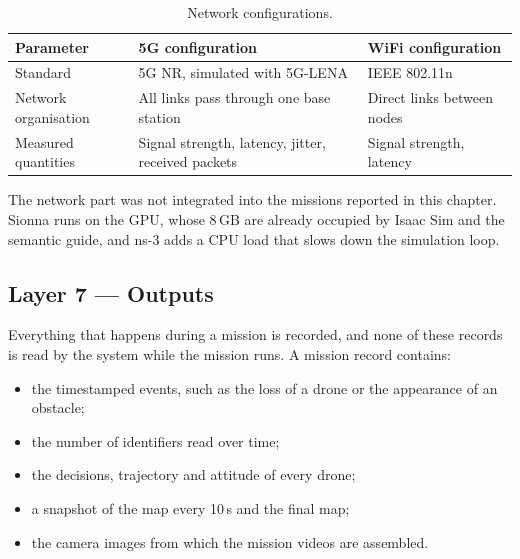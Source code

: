 \begin{table}[H]
    \centering
    \caption{Network configurations.}%
    \label{tab:impl:network}
    \small
    \singlespacing
    \setlength{\tabcolsep}{4pt}
    \begin{tabular}{@{}>{\raggedright\arraybackslash}p{3.6cm}
            >{\raggedright\arraybackslash}p{5.5cm}
            >{\raggedright\arraybackslash}p{5.5cm}@{}}
        \toprule
        \textbf{Parameter}       & \textbf{5G configuration}                                   & \textbf{WiFi configuration}          \\
        \midrule
        Standard                 & 5G NR, simulated with 5G-LENA                               & IEEE 802.11n                         \\
        Network organisation     & All links pass through one base station                     & Direct links between nodes           \\
        Measured quantities      & Signal strength, latency, jitter, received packets          & Signal strength, latency             \\
        \bottomrule
    \end{tabular}
\end{table}

The network part was not integrated into the missions reported in this chapter.
Sionna runs on the GPU, whose 8\,GB are already occupied by Isaac Sim and the
semantic guide, and ns-3 adds a CPU load that slows down the simulation loop.

\subsection*{Layer 7 --- Outputs}

Everything that happens during a mission is recorded, and none of these records
is read by the system while the mission runs. A mission record contains:

\begin{itemize}[itemsep=0.2em]
    \item the timestamped events, such as the loss of a drone or the appearance of
          an obstacle;
    \item the number of identifiers read over time;
    \item the decisions, trajectory and attitude of every drone;
    \item a snapshot of the map every 10\,s and the final map;
    \item the camera images from which the mission videos are assembled.
\end{itemize}

